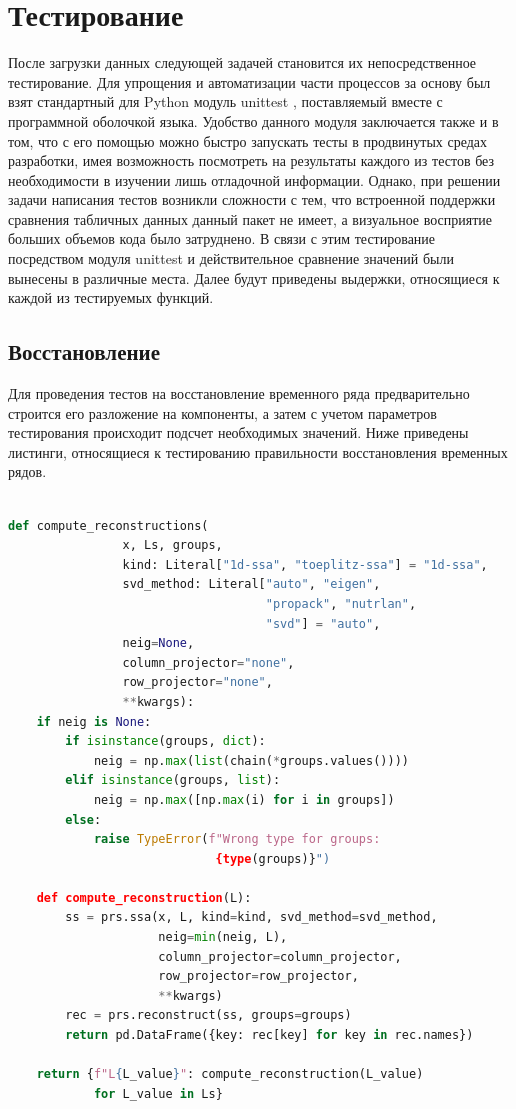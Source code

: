 \documentclass[specialist,
			   substylefile = spbu_report.rtx,
			   subf,href,colorlinks=true, 12pt]{disser}
\begin{document}
\section{Тестирование}

После загрузки данных следующей задачей становится их непосредственное тестирование. Для упрощения и автоматизации части процессов за основу был взят стандартный для Python модуль unittest \cite{unittest-doc}, поставляемый вместе с программной оболочкой языка. Удобство данного модуля заключается также и в том, что с его помощью можно быстро запускать тесты в продвинутых средах разработки, имея возможность посмотреть на результаты каждого из тестов без необходимости в изучении лишь отладочной информации. Однако, при решении задачи написания тестов возникли сложности с тем, что встроенной поддержки сравнения табличных данных данный пакет не имеет, а визуальное восприятие больших объемов кода было затруднено. В связи с этим тестирование посредством модуля unittest и действительное сравнение значений были вынесены в различные места. Далее будут приведены выдержки, относящиеся к каждой из тестируемых функций.

\subsection{Восстановление}

Для проведения тестов на восстановление временного ряда предварительно строится его разложение на компоненты, а затем с учетом параметров тестирования происходит подсчет необходимых значений. Ниже приведены листинги, относящиеся к тестированию правильности восстановления временных рядов.
 
\begin{lstlisting}[language=Python, caption=Функции для подсчета значений восстановления временного ряда при тестировании.]
	
def compute_reconstructions(
                x, Ls, groups,
                kind: Literal["1d-ssa", "toeplitz-ssa"] = "1d-ssa",
                svd_method: Literal["auto", "eigen", 
                                    "propack", "nutrlan",
                                    "svd"] = "auto",
                neig=None,
                column_projector="none",
                row_projector="none",
                **kwargs):
    if neig is None:
        if isinstance(groups, dict):
            neig = np.max(list(chain(*groups.values())))
        elif isinstance(groups, list):
            neig = np.max([np.max(i) for i in groups])
        else:
            raise TypeError(f"Wrong type for groups: 
                             {type(groups)}")

    def compute_reconstruction(L):
        ss = prs.ssa(x, L, kind=kind, svd_method=svd_method,
                     neig=min(neig, L),
                     column_projector=column_projector,
                     row_projector=row_projector,
                     **kwargs)
        rec = prs.reconstruct(ss, groups=groups)
        return pd.DataFrame({key: rec[key] for key in rec.names})

    return {f"L{L_value}": compute_reconstruction(L_value)
    	    for L_value in Ls}

\end{lstlisting}
\end{document}
